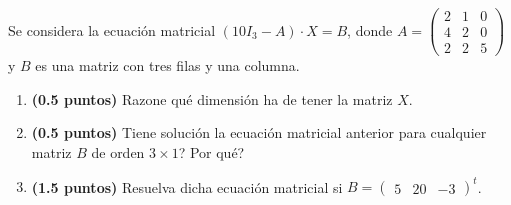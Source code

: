 
Se considera la ecuación matricial $(10I_3-A)\cdot X=B$, donde
$A=\begin{pmatrix}2&1&0\\4&2&0\\2&2&5\end{pmatrix}$ y $B$ es una matriz con
tres filas y una columna.
\begin{enumerate}[label=\alph*)]
  \item \textbf{(0.5 puntos)} Razone qué dimensión ha de tener la matriz $X$.
  \item \textbf{(0.5 puntos)} \textquestiondown{}Tiene solución la ecuación
  matricial anterior para cualquier matriz $B$ de orden $3\times 1$?
  \textquestiondown{}Por qué?
  \item \textbf{(1.5 puntos)} Resuelva dicha ecuación matricial si
  $B=\begin{pmatrix}5&20&-3\end{pmatrix}^t$.
\end{enumerate}
